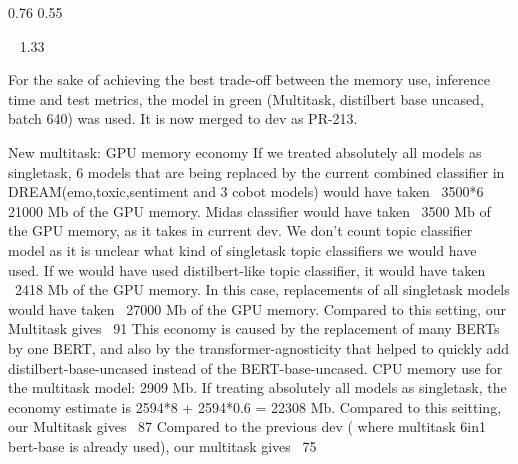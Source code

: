 0.76
0.55


~ 1.33


For the sake of achieving the best trade-off between the memory use, inference time and test metrics, the model in green (Multitask, distilbert base uncased, batch 640) was used. It is now merged to dev as PR-213.


New multitask: GPU memory economy
If we treated absolutely all models as singletask, 6 models that are being replaced by the current combined classifier in DREAM(emo,toxic,sentiment and 3 cobot models) would have taken ~3500*6 ~ 21000 Mb of the GPU memory. Midas classifier would have taken ~3500 Mb of the GPU memory, as it takes in current dev.  We don’t count topic classifier model as it is unclear what kind of singletask topic classifiers we would have used. If we would have used distilbert-like topic classifier, it would have taken ~2418 Mb of the GPU memory. In this case, replacements of all singletask models would have taken ~27000 Mb of the GPU memory.  Compared to this setting, our Multitask gives ~91%
This economy is caused by the replacement of many BERTs by one BERT, and also by the transformer-agnosticity that helped to quickly add distilbert-base-uncased instead of the BERT-base-uncased.
CPU memory use for the multitask model: 2909 Mb. If treating absolutely all models as singletask, the economy estimate is 2594*8 + 2594*0.6 = 22308 Mb. Compared to this seitting, our Multitask gives ~87%
Compared to the previous dev ( where multitask 6in1 bert-base is already used), our multitask gives ~75%



